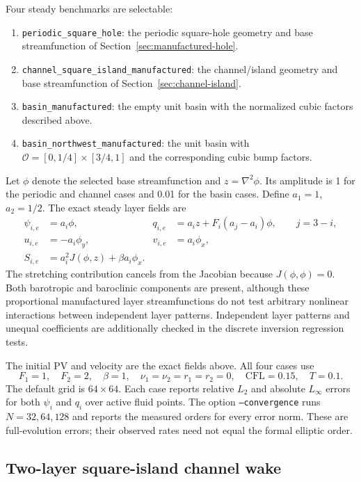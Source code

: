 \documentclass[11pt]{article}
\newcommand{\lap}{\nabla^2}
\newcommand{\Oh}{\mathcal{O}}
\begin{document}
Four steady benchmarks are selectable:
\begin{enumerate}
 \item \texttt{periodic\_square\_hole}: the periodic square-hole geometry and
   base streamfunction of Section~\ref{sec:manufactured-hole}.
 \item \texttt{channel\_square\_island\_manufactured}: the channel/island geometry and
   base streamfunction of Section~\ref{sec:channel-island}.
 \item \texttt{basin\_manufactured}: the empty unit basin with the
   normalized cubic factors described above.
 \item \texttt{basin\_northwest\_manufactured}: the unit basin with
   $\Oh=[0,1/4]\times[3/4,1]$ and the corresponding cubic bump factors.
\end{enumerate}
Let $\phi$ denote the selected base streamfunction and $z=\lap\phi$.
Its amplitude is 1 for the periodic and channel cases and 0.01 for the
basin cases.  Define $a_1=1$, $a_2=1/2$.  The exact steady layer fields are
\begin{align}
 \psi_{i,e}&=a_i\phi,&
 q_{i,e}&=a_i z+F_i(a_j-a_i)\phi,\qquad j=3-i,\\
 u_{i,e}&=-a_i\phi_y,&v_{i,e}&=a_i\phi_x,\\
 S_{i,e}&=a_i^2J(\phi,z)+\beta a_i\phi_x.
\end{align}
The stretching contribution cancels from the Jacobian because
$J(\phi,\phi)=0$. Both barotropic and baroclinic components are present,
although these proportional manufactured layer streamfunctions do not
test arbitrary nonlinear interactions between independent layer patterns.
Independent layer patterns and unequal coefficients are additionally
checked in the discrete inversion regression tests.

The initial PV and velocity are the exact fields above. All four cases use
\[
 F_1=1,\quad F_2=2,\quad \beta=1,\quad
 \nu_1=\nu_2=r_1=r_2=0,\quad
 \mathrm{CFL}=0.15,\quad T=0.1.
\]
The default grid is $64\times64$. Each case reports relative $L_2$ and
absolute $L_\infty$ errors for both $\psi_i$ and $q_i$ over active fluid
points. The option \texttt{--convergence} runs $N=32,64,128$ and reports
the measured orders for every error norm. These are full-evolution
errors; their observed rates need not equal the formal elliptic order.

\subsection{Two-layer square-island channel wake}
\end{document}
